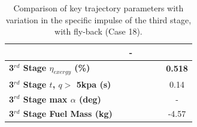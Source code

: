\begin{table}[ht]
\begin{tabular}{l c c c c c c}
		& \returnFuelISPThreeOneHundredTen
		& -
		\\
		\hline 
		\textbf{3$^{rd}$ Stage $\eta_{exergy}$ (\%)}
		& \textbf{\thirddExergyEffISPThreeNinety}
		& \textbf{\thirddExergyEffISPThreeNinetyFive}
		& \textbf{\thirddExergyEffISPThreeStandard}
		& \textbf{\thirddExergyEffISPThreeOneHundredFive}
		& \textbf{\thirddExergyEffISPThreeOneHundredTen}
		& \textbf{0.518}
		\\
		\textbf{3$^{rd}$ Stage $t$, $q >$ 5kpa (s)}
		& \thirdqOverFiveISPThreeNinety
		& \thirdqOverFiveISPThreeNinetyFive
		& \thirdqOverFiveISPThreeStandard
		& \thirdqOverFiveISPThreeOneHundredFive
		& \thirdqOverFiveISPThreeOneHundredTen
		&0.14
		\\
		\textbf{3$^{rd}$ Stage max $\alpha$ (deg)}
		& \thirdmaxAoAISPThreeNinety
		& \thirdmaxAoAISPThreeNinetyFive
		& \thirdmaxAoAISPThreeStandard
		& \thirdmaxAoAISPThreeOneHundredFive
		& \thirdmaxAoAISPThreeOneHundredTen
		& -
		\\
		\textbf{3$^{rd}$ Stage Fuel Mass (kg)}
		& \thirdmFuelISPThreeNinety
		& \thirdmFuelISPThreeNinetyFive
		& \thirdmFuelISPThreeStandard
		& \thirdmFuelISPThreeOneHundredFive
		& \thirdmFuelISPThreeOneHundredTen
		&-4.57
		\\
		\hline 
	\end{tabular} 
	\caption{Comparison of key trajectory parameters with variation in the specific impulse of the third stage, with fly-back (Case 18).}
	\label{tab:isp3}
\end{table}

